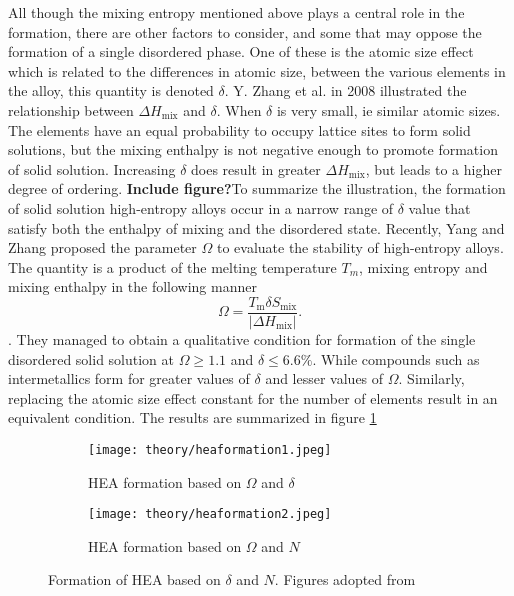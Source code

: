 All though the mixing entropy mentioned above plays a central role in the formation, there are other factors to consider, and some that may oppose the formation of a single disordered phase. One of these is the atomic size effect which is related to the differences in atomic size, between the various elements in the alloy, this quantity is denoted $\delta$. Y. Zhang et al. in 2008 illustrated the relationship between $\Delta H_\text{mix}$ and $\delta$. When $\delta$ is very small, ie similar atomic sizes. The elements have an equal probability to occupy lattice sites to form solid solutions, but the mixing enthalpy is not negative enough to promote formation of solid solution. Increasing $\delta$ does result in greater $\Delta H_\text{mix}$, but leads to a higher degree of ordering. \textbf{Include figure?}To summarize the illustration, the formation of solid solution high-entropy alloys occur in a narrow range of $\delta$ value that satisfy both the enthalpy of mixing and the disordered state. Recently, Yang and Zhang proposed the parameter $\Omega$ to evaluate the stability of high-entropy alloys. The quantity is a product of the melting temperature $T_m$, mixing entropy and mixing enthalpy in the following manner
\begin{equation}
\Omega = \frac{T_\text{m} \delta S_\text{mix}}{|\Delta H_\text{mix}|}.
\end{equation}
. They managed to obtain a qualitative condition for formation of the single disordered solid solution at $\Omega \geq 1.1$ and $\delta \leq 6.6\%$. While compounds such as intermetallics form for greater values of $\delta$ and lesser values of $\Omega$. Similarly, replacing the atomic size effect constant for the number of elements result in an equivalent condition. The results are summarized in figure \ref{Omega}

\begin{figure} 
\centering
\begin{subfigure}{0.7\textwidth}
\texttt{[image: theory/heaformation1.jpeg]}
\caption{HEA formation based on $\Omega$ and $\delta$}
\end{subfigure}
\begin{subfigure}{0.7\textwidth}
\texttt{[image: theory/heaformation2.jpeg]}
\caption{HEA formation based on $\Omega$ and $N$}
\end{subfigure}
\caption{Formation of HEA based on $\delta$ and $N$. Figures adopted from \cite{hea2016_ch2}}
\label{Omega} 
\end{figure} 

